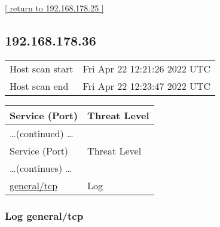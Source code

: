\documentclass{article}
\begin{document}
\begin{footnotesize}\hyperref[host:192.168.178.25]{[ return to 192.168.178.25 ]}\end{footnotesize}
\subsection{192.168.178.36}
\label{host:192.168.178.36}

\begin{tabular}{ll}
Host scan start&Fri Apr 22 12:21:26 2022 UTC\\
Host scan end&Fri Apr 22 12:23:47 2022 UTC\\
\end{tabular}

\begin{longtable}{|l|l|}
\hline
\rowcolor{gvm_report}Service (Port)&Threat Level\\
\hline
\endfirsthead
\multicolumn{2}{l}{\hfill\ldots (continued) \ldots}\\
\hline
\rowcolor{gvm_report}Service (Port)&Threat Level\\
\hline
\endhead
\hline
\multicolumn{2}{l}{\ldots (continues) \ldots}\\
\endfoot
\hline
\endlastfoot
\hline
\hyperref[port:192.168.178.36 general/tcp Log]{general/tcp}&Log\\
\hline
\end{longtable}



\subsubsection{Log general/tcp}
\label{port:192.168.178.36 general/tcp Log}
\end{document}
